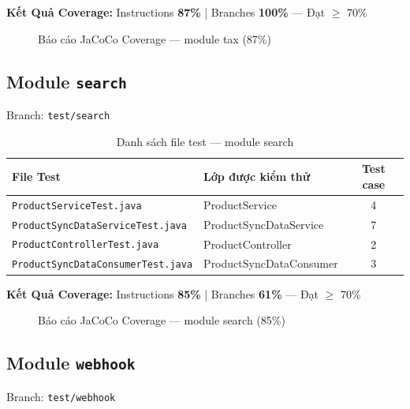\textbf{Kết Quả Coverage:} Instructions \textbf{87\%} | Branches \textbf{100\%} --- Đạt $\geq$ 70\%

\begin{figure}[H]
\centering
{}
\caption{Báo cáo JaCoCo Coverage --- module tax (87\%)}
\end{figure}

\subsection{Module \texttt{search}}

Branch: \texttt{test/search}

\begin{table}[H]
\centering
\caption{Danh sách file test --- module search}
\begin{tabular}{|l|l|c|}
\hline
\textbf{File Test} & \textbf{Lớp được kiểm thử} & \textbf{Test case} \\
\hline
\texttt{ProductServiceTest.java} & ProductService & 4 \\
\hline
\texttt{ProductSyncDataServiceTest.java} & ProductSyncDataService & 7 \\
\hline
\texttt{ProductControllerTest.java} & ProductController & 2 \\
\hline
\texttt{ProductSyncDataConsumerTest.java} & ProductSyncDataConsumer & 3 \\
\hline
\end{tabular}
\end{table}

\textbf{Kết Quả Coverage:} Instructions \textbf{85\%} | Branches \textbf{61\%} --- Đạt $\geq$ 70\%

\begin{figure}[H]
\centering
{}
\caption{Báo cáo JaCoCo Coverage --- module search (85\%)}
\end{figure}

\subsection{Module \texttt{webhook}}

Branch: \texttt{test/webhook}

